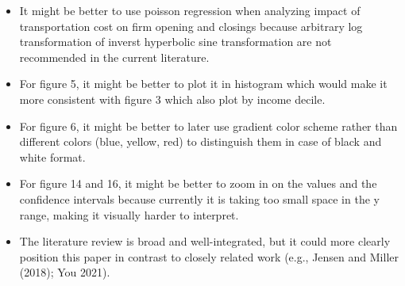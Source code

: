 \documentclass[
  letterpaper,
  DIV=11,
  numbers=noendperiod]{scrartcl}
\begin{document}
\begin{itemize}
\item
  It might be better to use poisson regression when analyzing impact of
  transportation cost on firm opening and closings because arbitrary log
  transformation of inverst hyperbolic sine transformation are not
  recommended in the current literature.
\item
  For figure 5, it might be better to plot it in histogram which would
  make it more consistent with figure 3 which also plot by income
  decile.
\item
  For figure 6, it might be better to later use gradient color scheme
  rather than different colors (blue, yellow, red) to distinguish them
  in case of black and white format.
\item
  For figure 14 and 16, it might be better to zoom in on the values and
  the confidence intervals because currently it is taking too small
  space in the y range, making it visually harder to interpret.
\item
  The literature review is broad and well-integrated, but it could more
  clearly position this paper in contrast to closely related work (e.g.,
  Jensen and Miller (2018); You 2021).
\end{itemize}
\end{document}
